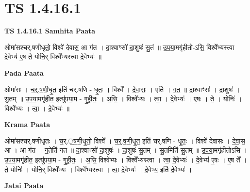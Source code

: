 \documentclass[17pt]{extarticle}
\begin{document}
\section{ TS 1.4.16.1 }

\textbf{TS 1.4.16.1 } \newline
\textbf{Samhita Paata} \newline

ओमा॑सश्चर्.षणीधृतो॒ विश्वे॑ देवास॒ आ ग॑त । दा॒श्वाꣳसो॑ दा॒शुषः॑ सु॒तं ॥ उ॒प॒या॒मगृ॑हीतो-ऽसि॒ विश्वे᳚भ्यस्त्वा दे॒वेभ्य॑ ए॒ष ते॒ योनि॒र् विश्वे᳚भ्यस्त्वा दे॒वेभ्यः॑ ॥ \newline

\textbf{Pada Paata} \newline

ओमा॑सः । च॒र्॒.ष॒णी॒धृ॒त॒ इति॑ चर्.षणि - धृ॒तः॒ । विश्वे᳚ । दे॒वा॒सः॒ । एति॑ । ग॒त॒ ॥ दा॒श्वाꣳसः॑ । दा॒शुषः॑ । सु॒तम् ॥ उ॒प॒या॒मगृ॑हीत॒ इत्यु॑पया॒म - गृ॒ही॒तः॒ । अ॒सि॒ । विश्वे᳚भ्यः । त्वा॒ । दे॒वेभ्यः॑ । ए॒षः । ते॒ । योनिः॑ । विश्वे᳚भ्यः । त्वा॒ । दे॒वेभ्यः॑ ॥  \newline


\textbf{Krama Paata} \newline

ओमा॑सश्चर्.षणीधृतः । च॒र्.॒ष॒णी॒धृ॒तो॒ विश्वे᳚ । च॒र्॒.ष॒णी॒धृ॒त॒ इति॑ चर्.षणि - धृ॒तः॒ । विश्वे॑ देवासः । दे॒वा॒स॒ आ । आ ग॑त । ग॒तेति॑ गत ॥ दा॒श्वाꣳसो॑ दा॒शुषः॑ । दा॒शुषः॑ सु॒तम् । सु॒तमिति॑ सु॒तम् ॥ उ॒प॒या॒मगृ॑हीतोऽसि । उ॒प॒या॒मगृ॑हीत॒ इत्यु॑पया॒म - गृ॒ही॒तः॒ । अ॒सि॒ विश्वे᳚भ्यः । विश्वे᳚भ्यस्त्वा । त्वा॒ दे॒वेभ्यः॑ । दे॒वेभ्य॑ ए॒षः । ए॒ष ते᳚ । ते॒ योनिः॑ । योनि॒र् विश्वे᳚भ्यः । विश्वे᳚भ्यस्त्वा । त्वा॒ दे॒वेभ्यः॑ । दे॒वेभ्य॒ इति॑ दे॒वेभ्यः॑ । \newline

\textbf{Jatai Paata} \newline
\end{document}
